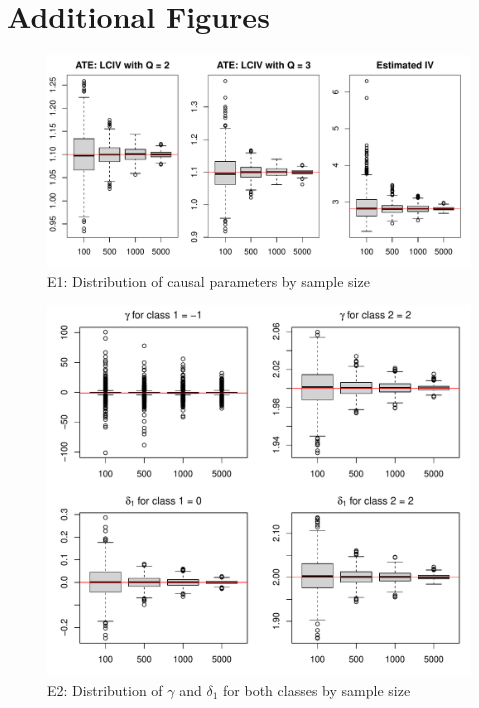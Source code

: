 \documentclass[12pt]{article}
\begin{document}

\pagebreak
\newpage
\appendix
{}

\section{Additional Figures}\label{app:add-tables}

\begin{figure}[H]
	\caption{E1: Distribution of causal parameters by sample size}\label{fig:figure-A1}
	\centering
	\includegraphics[width =\textwidth]{fig3a-1} 
\end{figure}


\begin{figure}[H]
	\caption{E2: Distribution of $\gamma$ and $\delta_1$ for both classes by sample size}\label{fig:figure-A2}
	\centering
	\includegraphics[width =\textwidth]{fig1c-1} 
\end{figure}
\end{document}
